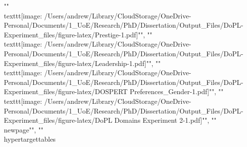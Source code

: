 {{{{{{{{{{{{{{{{{{{{{{{{{{{""\\texttt{[image: /Users/andrew/Library/CloudStorage/OneDrive-Personal/Documents/1\_UoE/Research/PhD/Dissertation/Output\_Files/DoPL-Experiment\_files/figure-latex/Prestige-1.pdf]}"", ""\\texttt{[image: /Users/andrew/Library/CloudStorage/OneDrive-Personal/Documents/1\_UoE/Research/PhD/Dissertation/Output\_Files/DoPL-Experiment\_files/figure-latex/Leadership-1.pdf]}"", ""\\texttt{[image: /Users/andrew/Library/CloudStorage/OneDrive-Personal/Documents/1\_UoE/Research/PhD/Dissertation/Output\_Files/DoPL-Experiment\_files/figure-latex/DOSPERT Preferences\_Gender-1.pdf]}"", 
""\\texttt{[image: /Users/andrew/Library/CloudStorage/OneDrive-Personal/Documents/1\_UoE/Research/PhD/Dissertation/Output\_Files/DoPL-Experiment\_files/figure-latex/DoPL Domains Experiment 2-1.pdf]}"", ""\\newpage"", ""\\hypertarget{tables}{%
}}}}}}}}}}}}}}}}}}}}}}}}}}}}
